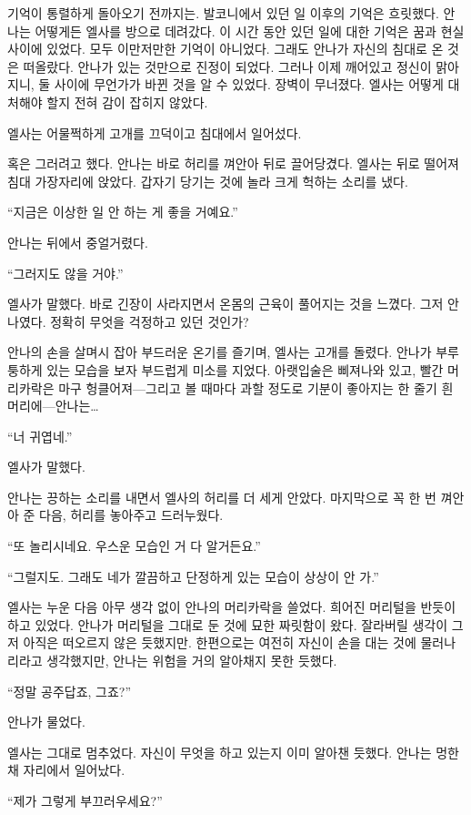 기억이 통렬하게 돌아오기 전까지는. 발코니에서 있던 일 이후의 기억은 흐릿했다. 안나는 어떻게든 엘사를 방으로 데려갔다. 이 시간 동안 있던 일에 대한 기억은 꿈과 현실 사이에 있었다. 모두 이만저만한 기억이 아니었다. 그래도 안나가 자신의 침대로 온 것은 떠올랐다. 안나가 있는 것만으로 진정이 되었다. 그러나 이제 깨어있고 정신이 맑아지니, 둘 사이에 무언가가 바뀐 것을 알 수 있었다. 장벽이 무너졌다. 엘사는 어떻게 대처해야 할지 전혀 감이 잡히지 않았다.

엘사는 어물쩍하게 고개를 끄덕이고 침대에서 일어섰다.

혹은 그러려고 했다. 안나는 바로 허리를 껴안아 뒤로 끌어당겼다. 엘사는 뒤로 떨어져 침대 가장자리에 앉았다. 갑자기 당기는 것에 놀라 크게 헉하는 소리를 냈다.

``지금은 이상한 일 안 하는 게 좋을 거예요.''

안나는 뒤에서 중얼거렸다.

``그러지도 않을 거야.''

엘사가 말했다. 바로 긴장이 사라지면서 온몸의 근육이 풀어지는 것을 느꼈다. 그저 안나였다. 정확히 무엇을 걱정하고 있던 것인가?

안나의 손을 살며시 잡아 부드러운 온기를 즐기며, 엘사는 고개를 돌렸다. 안나가 부루퉁하게 있는 모습을 보자 부드럽게 미소를 지었다. 아랫입술은 삐져나와 있고, 빨간 머리카락은 마구 헝클어져—그리고 볼 때마다 과할 정도로 기분이 좋아지는 한 줄기 흰 머리에—안나는\ldots

``너 귀엽네.''

엘사가 말했다.

안나는 끙하는 소리를 내면서 엘사의 허리를 더 세게 안았다. 마지막으로 꼭 한 번 껴안아 준 다음, 허리를 놓아주고 드러누웠다.

``또 놀리시네요. 우스운 모습인 거 다 알거든요.''

``그럴지도. 그래도 네가 깔끔하고 단정하게 있는 모습이 상상이 안 가.''

엘사는 누운 다음 아무 생각 없이 안나의 머리카락을 쓸었다. 희어진 머리털을 반듯이 하고 있었다. 안나가 머리털을 그대로 둔 것에 묘한 짜릿함이 왔다. 잘라버릴 생각이 그저 아직은 떠오르지 않은 듯했지만. 한편으로는 여전히 자신이 손을 대는 것에 물러나리라고 생각했지만, 안나는 위험을 거의 알아채지 못한 듯했다.

``정말 공주답죠, 그죠?''

안나가 물었다.

엘사는 그대로 멈추었다. 자신이 무엇을 하고 있는지 이미 알아챈 듯했다. 안나는 멍한 채 자리에서 일어났다.

``제가 그렇게 부끄러우세요?''


